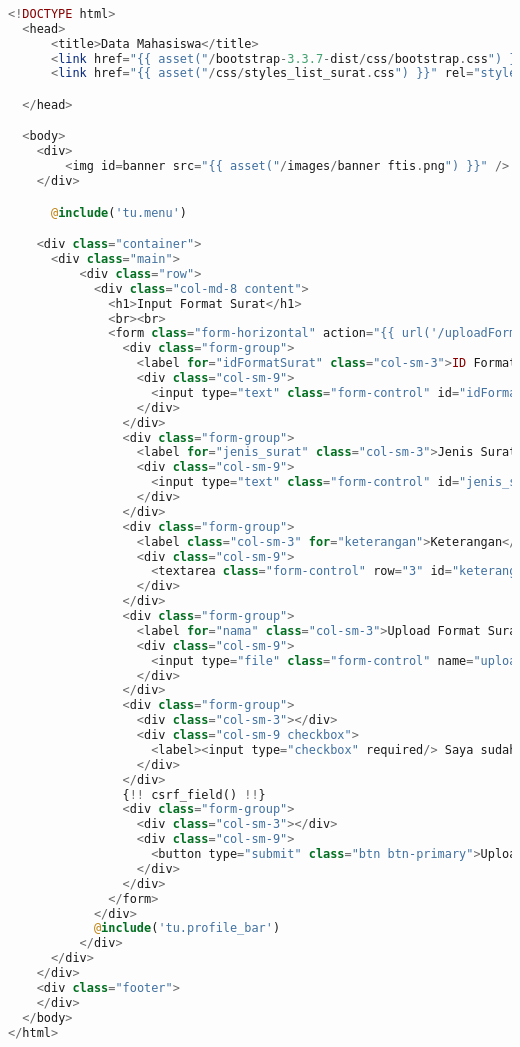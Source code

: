 \begin{lstlisting}[language=php,basicstyle=\tiny,caption=Tambah format surat]
	
<!DOCTYPE html>
  <head>
      <title>Data Mahasiswa</title>
      <link href="{{ asset("/bootstrap-3.3.7-dist/css/bootstrap.css") }}" rel="stylesheet" type="text/css" />
      <link href="{{ asset("/css/styles_list_surat.css") }}" rel="stylesheet" type="text/css">

  </head>

  <body>
    <div>
        <img id=banner src="{{ asset("/images/banner ftis.png") }}" />
    </div>

      @include('tu.menu')

    <div class="container">
      <div class="main">
          <div class="row">
            <div class="col-md-8 content">
              <h1>Input Format Surat</h1>
              <br><br>
              <form class="form-horizontal" action="{{ url('/uploadFormat')}}" method="post"  enctype="multipart/form-data">
                <div class="form-group">
                  <label for="idFormatSurat" class="col-sm-3">ID Format Surat</label>
                  <div class="col-sm-9">
                    <input type="text" class="form-control" id="idFormatSurat" name="idFormatSurat" required>
                  </div>
                </div>
                <div class="form-group">
                  <label for="jenis_surat" class="col-sm-3">Jenis Surat</label>
                  <div class="col-sm-9">
                    <input type="text" class="form-control" id="jenis_surat" name="jenis_surat" required />
                  </div>
                </div>
                <div class="form-group">
                  <label class="col-sm-3" for="keterangan">Keterangan</label>
                  <div class="col-sm-9">
                    <textarea class="form-control" row="3" id="keterangan" name="keterangan" required></textarea>
                  </div>
                </div>
                <div class="form-group">
                  <label for="nama" class="col-sm-3">Upload Format Surat</label>
                  <div class="col-sm-9">
                    <input type="file" class="form-control" name="uploadFormat" required />
                  </div>
                </div>
                <div class="form-group">
                  <div class="col-sm-3"></div>
                  <div class="col-sm-9 checkbox">
                    <label><input type="checkbox" required/> Saya sudah yakin</label>
                  </div>
                </div>
                {!! csrf_field() !!}
                <div class="form-group">
                  <div class="col-sm-3"></div>
                  <div class="col-sm-9">
                    <button type="submit" class="btn btn-primary">Upload format surat (.TeX)</button>
                  </div>
                </div>
              </form>
            </div>
            @include('tu.profile_bar')
          </div>
      </div>
    </div>
    <div class="footer">
    </div>
  </body>
</html>

\end{lstlisting}

